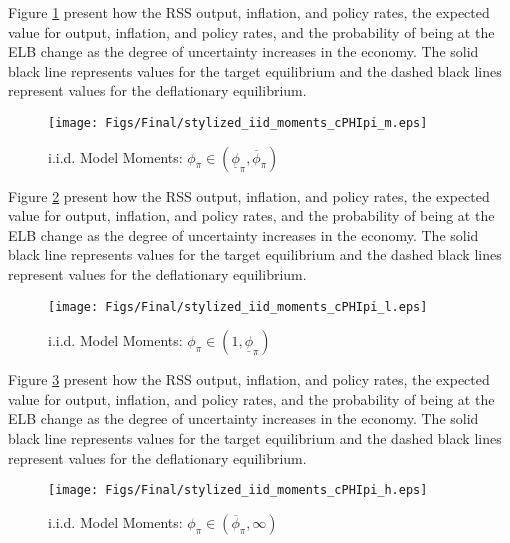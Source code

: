 \documentclass[11pt]{article}
\begin{document}
\begin{singlespace}
		Figure \ref{fig:iidMomentscPHIpiM} present how the RSS output, inflation, and policy rates, the expected value for output, inflation, and policy rates, and the probability of being at the ELB change as the degree of uncertainty increases in the economy. The solid black line represents values for the target equilibrium and the dashed black lines represent values for the deflationary equilibrium. 
		
		\begin{figure}[H]  %
			\begin{center}
				\caption{i.i.d. Model Moments: $\phi_{\pi}\in(\underline{\phi}_{\pi},\overline{\phi}_{\pi})$}
				\texttt{[image: Figs/Final/stylized\_iid\_moments\_cPHIpi\_m.eps]}
				\label{fig:iidMomentscPHIpiM}
			\end{center}
		\end{figure}
		
		Figure \ref{fig:iidMomentscPHIpiL} present how the RSS output, inflation, and policy rates, the expected value for output, inflation, and policy rates, and the probability of being at the ELB change as the degree of uncertainty increases in the economy. The solid black line represents values for the target equilibrium and the dashed black lines represent values for the deflationary equilibrium. 
		
		\begin{figure}[H]  %
			\begin{center}
				\caption{i.i.d. Model Moments: $\phi_{\pi}\in(1,\underline{\phi}_{\pi})$}
				\texttt{[image: Figs/Final/stylized\_iid\_moments\_cPHIpi\_l.eps]}
				\label{fig:iidMomentscPHIpiL}
			\end{center}
		\end{figure}
		
		Figure \ref{fig:iidMomentscPHIpiH} present how the RSS output, inflation, and policy rates, the expected value for output, inflation, and policy rates, and the probability of being at the ELB change as the degree of uncertainty increases in the economy. The solid black line represents values for the target equilibrium and the dashed black lines represent values for the deflationary equilibrium. 
		
		\begin{figure}[H]  %
			\begin{center}
				\caption{i.i.d. Model Moments: $\phi_{\pi}\in(\overline{\phi}_{\pi},\infty)$}
				\texttt{[image: Figs/Final/stylized\_iid\_moments\_cPHIpi\_h.eps]}
				\label{fig:iidMomentscPHIpiH}
			\end{center}
		\end{figure}
		

\end{singlespace}
\end{document}
